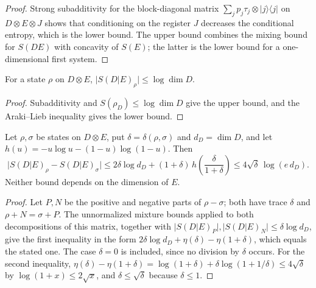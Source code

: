 \begin{proof}\leanok
    Strong subadditivity for the block-diagonal matrix
    $\sum_jp_j\tau_j\otimes\lvert j\rangle\langle j\rvert$ on
    $D\otimes E\otimes J$ shows that conditioning on the register $J$
    decreases the conditional entropy, which is the lower bound. The upper
    bound combines the mixing bound for $S(DE)$ with concavity of $S(E)$; the
    latter is the lower bound for a one-dimensional first system.
\end{proof}

\begin{lemma}
    \label{lem:conditional_entropy_dimension}
    \leanok
    For a state $\rho$ on $D\otimes E$, $\lvert S(D|E)_\rho\rvert\le\log\dim D$.
\end{lemma}

\begin{proof}\leanok
    Subadditivity and $S(\rho_D)\le\log\dim D$ give the upper bound, and the
    Araki--Lieb inequality gives the lower bound.
\end{proof}

\begin{theorem}
    \label{thm:conditional_entropy_continuity}
    \leanok
    Let $\rho,\sigma$ be states on $D\otimes E$, put
    $\delta=\delta(\rho,\sigma)$ and $d_D=\dim D$, and let
    $h(u)=-u\log u-(1-u)\log(1-u)$. Then
    \[
      \lvert S(D|E)_\rho-S(D|E)_\sigma\rvert
      \le2\delta\log d_D+(1+\delta)\,h\!\left(\frac{\delta}{1+\delta}\right)
      \le4\sqrt\delta\,\log(e\,d_D).
    \]
    Neither bound depends on the dimension of $E$.
\end{theorem}

\begin{proof}\leanok
    Let $P,N$ be the positive and negative parts of $\rho-\sigma$; both have
    trace $\delta$ and $\rho+N=\sigma+P$. The unnormalized mixture bounds
    applied to both decompositions of this matrix, together with
    $\lvert S(D|E)_P\rvert,\lvert S(D|E)_N\rvert\le\delta\log d_D$, give the
    first inequality in the form $2\delta\log d_D+\eta(\delta)-\eta(1+\delta)$,
    which equals the stated one. The case $\delta=0$ is included, since no
    division by $\delta$ occurs. For the second inequality,
    $\eta(\delta)-\eta(1+\delta)=\log(1+\delta)+\delta\log(1+1/\delta)
    \le4\sqrt\delta$ by $\log(1+x)\le2\sqrt x$, and $\delta\le\sqrt\delta$
    because $\delta\le1$.
\end{proof}

